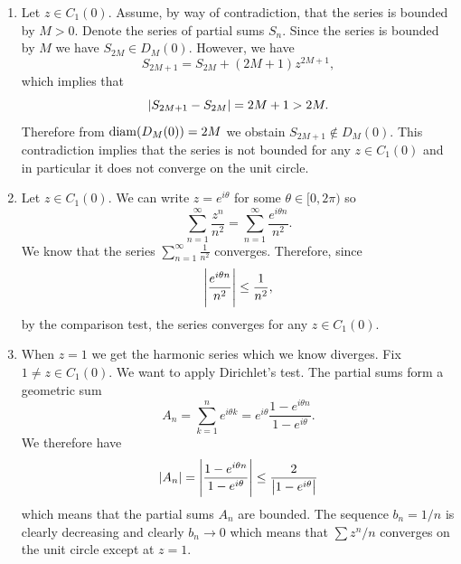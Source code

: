 \documentclass[11pt,a4paper]{article}
\begin{document}
\begin{solution} \phantom{}
  \begin{enumerate}
    \item[(a)] Let $z \in C_1(0)$.
      Assume, by way of contradiction,
      that the series is bounded by $M > 0$.
      Denote the series of partial sums $S_n$.
      Since the series is bounded by $M$ we have $S_{2M} \in D_{M}(0)$.
      However, we have
      \[
        S_{2M + 1} = S_{2M} + (2M + 1) z^{2M + 1},
      \]
      which implies that
      \[
        \left\lvert S_{2M + 1} - S_{2M}\right\rvert = 2M + 1 > 2M.
      \]
      Therefore from $\operatorname{diam}(D_{M}(0)) = 2M$
      we obstain $S_{2M + 1} \notin D_{M}(0)$.
      This contradiction implies that the series is not bounded for any
      $z \in C_1(0)$ and in particular it does not converge on the unit circle.
    \item[(b)] Let $z \in C_1(0)$.
      We can write $z = e^{i \theta}$ for some $\theta \in [0,2\pi)$ so
      \[
        \sum_{n=1}^{\infty} \frac{z^n}{n^2} =
        \sum_{n=1}^{\infty} \frac{e^{i \theta n}}{n^2}.
      \]
      We know that the series $\sum_{n=1}^{\infty} \frac{1}{n^2}$ converges.
      Therefore, since
      \[
        \left\lvert\frac{e^{i \theta n}}{n^2}\right\rvert \le \frac{1}{n^2},
      \]
      by the comparison test, the series converges for any $z \in C_1(0)$.
    \item[(c)] When $z = 1$ we get the harmonic series which we know diverges.
      Fix $1 \neq z \in C_1(0)$.
      We want to apply Dirichlet's test.
      The partial sums form a geometric sum
      \[
        A_n =
        \sum_{k=1}^{n} e^{i \theta k} =
        e^{i \theta} \frac{1 - e^{i \theta n}}{1 - e^{i \theta}}.
      \]
      We therefore have
      \[
        |A_n| =
        \left\lvert\frac{1 - e^{i \theta n}}{1 - e^{i \theta}}\right\rvert \le
        \frac{2}{\left\lvert1 - e^{i \theta}\right\rvert}
      \]
      which means that the partial sums $A_n$ are bounded.
      The sequence $b_n = 1/n$ is clearly decreasing and clearly
      $b_n \to 0$ which means that $\sum z^n / n$ converges on the unit
      circle except at $z = 1$.
  \end{enumerate}
\end{solution}
\end{document}
